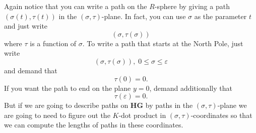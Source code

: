 \documentclass{ximera}
\begin{document}
Again notice that you can write a path on the $R$-sphere by giving a path
$\left(  \sigma\left(  t\right)  ,\tau\left(  t\right)  \right)  $ in the
$\left(  \sigma,\tau\right)  $-plane. In fact, you can use $\sigma$ as the
parameter $t$ and just write
\[
\left(  \sigma,\tau\left(  \sigma\right)  \right)
\]
where $\tau$ is a function of $\sigma$. To write a path that starts at the
North Pole, just write%
\[
\left(  \sigma,\tau\left(  \sigma\right)  \right)  ,\;0\leq\sigma
\leq\varepsilon
\]
and demand that%
\[
\tau\left(  0\right)  =0.
\]
If you want the path to end on the plane $y=0$, demand additionally that%
\[
\tau\left(  \varepsilon\right)  =0.
\]
But if we are going to describe paths on \textbf{HG} by paths in the $\left(
\sigma,\tau\right)  $-plane we are going to need to figure out the $K$-dot
product in $\left(  \sigma,\tau\right)  $-coordinates so that we can compute
the lengths of paths in these coordinates.
\end{document}
